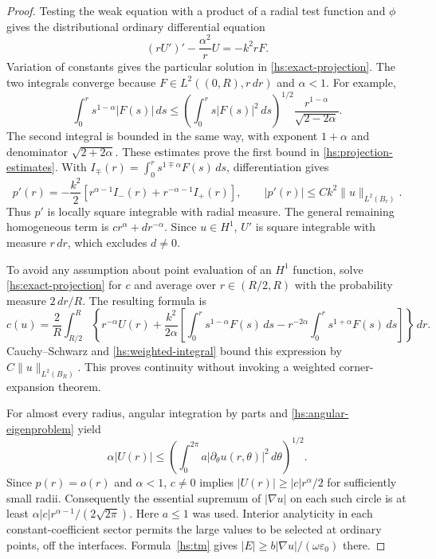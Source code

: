 \begin{proof}
Testing the weak equation with a product of a radial test function and
$\phi$ gives the distributional ordinary differential equation
\begin{equation}
 (rU')'-\frac{\alpha^2}{r}U=-k^2rF.
 \label{hs:radial-ode}
\end{equation}
Variation of constants gives the particular solution in
\eqref{hs:exact-projection}.  The two integrals converge because
$F\in L^2((0,R),r\,dr)$ and $\alpha<1$.  For example,
\begin{equation}
 \int_0^r s^{1-\alpha}|F(s)|\,ds
 \leq\left(\int_0^r s|F(s)|^2\,ds\right)^{1/2}
       \frac{r^{1-\alpha}}{\sqrt{2-2\alpha}}.
 \label{hs:weighted-integral}
\end{equation}
The second integral is bounded in the same way, with exponent
$1+\alpha$ and denominator $\sqrt{2+2\alpha}$.  These estimates prove
the first bound in \eqref{hs:projection-estimates}.  With
$I_\mp(r)=\int_0^r s^{1\mp\alpha}F(s)\,ds$, differentiation gives
\begin{equation}
 p'(r)=-\frac{k^2}{2}
       \left[r^{\alpha-1}I_-(r)+r^{-\alpha-1}I_+(r)\right],
 \qquad |p'(r)|\leq Ck^2\|u\|_{L^2(B_r)}.
 \label{hs:particular-derivative}
\end{equation}
Thus $p'$ is locally square integrable with radial measure.
The general remaining homogeneous term is $c r^\alpha+d r^{-\alpha}$.
Since $u\in H^1$, $U'$ is square integrable with measure $r\,dr$,
which excludes $d\ne0$.

To avoid any assumption about point evaluation of an $H^1$ function,
solve \eqref{hs:exact-projection} for $c$ and average over
$r\in(R/2,R)$ with the probability measure $2\,dr/R$.
The resulting formula is
\begin{equation}
 c(u)=\frac2R\int_{R/2}^R
 \left\{r^{-\alpha}U(r)+\frac{k^2}{2\alpha}
 \left[\int_0^r s^{1-\alpha}F(s)\,ds
 -r^{-2\alpha}\int_0^r s^{1+\alpha}F(s)\,ds\right]\right\}\,dr.
 \label{hs:coefficient-functional}
\end{equation}
Cauchy--Schwarz and \eqref{hs:weighted-integral} bound this expression
by $C\|u\|_{L^2(B_R)}$.  This proves continuity without invoking a
weighted corner-expansion theorem.

For almost every radius, angular integration by parts and
\eqref{hs:angular-eigenproblem} yield
\begin{equation}
 \alpha|U(r)|\leq
 \left(\int_0^{2\pi}a|\partial_\theta u(r,\theta)|^2\,d\theta\right)^{1/2}.
 \label{hs:gradient-lower-bound}
\end{equation}
Since $p(r)=o(r)$ and $\alpha<1$, $c\ne0$ implies
$|U(r)|\geq |c|r^\alpha/2$ for sufficiently small radii.
Consequently the essential supremum of $|\nabla u|$ on each such
circle is at least $\alpha|c|r^{\alpha-1}/(2\sqrt{2\pi})$.
Here $a\leq1$ was used.  Interior analyticity in each constant-coefficient
sector permits the large values to be selected at ordinary points,
off the interfaces.  Formula~\eqref{hs:tm} gives
$|E|\geq b|\nabla u|/(\omega\varepsilon_0)$ there.
\end{proof}

